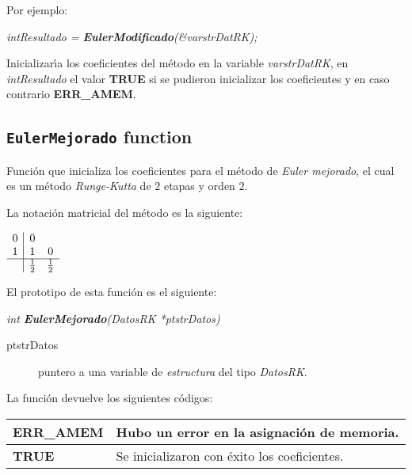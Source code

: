 Por ejemplo:

\begin{center}
\emph{intResultado = \textbf{EulerModificado}(\&varstrDatRK);}
\end{center}


Inicializar\'{\i}a los coeficientes del m\'etodo en la variable
\emph{varstrDatRK}, en \emph{intResultado} el valor \textbf{TRUE} si se pudieron
inicializar los coeficientes y en caso contrario \textbf{ERR\_AMEM}.

\subsection{\texttt{EulerMejorado} function}

Funci\'on que inicializa los coeficientes para el m\'etodo de \emph{Euler mejorado},
el cual es un m\'etodo \emph{Runge-Kutta} de $2$ etapas y orden $2$.\newline

La notaci\'on matricial del m\'etodo es la siguiente:

\begin{center}
$
\begin{array}{c|cc}
0 & 0 \\
1 & 1 & 0 \\
\hline
 & \frac{1}{2} & \frac{1}{2}
\end{array}
$
\end{center}

El prototipo de esta funci\'on es el siguiente:

\begin{center}
\emph{int \textbf{EulerMejorado}(DatosRK *ptstrDatos)}
\end{center}

\begin{description}
\item[ptstrDatos] puntero a una variable de \emph{estructura} del tipo
\emph{DatosRK}.
\end{description}

La funci\'on devuelve los siguientes c\'odigos:

\begin{center}
\begin{tabular}{|l|l|}
\hline
\textbf{ERR\_AMEM} & Hubo un error en la asignaci\'on de memoria. \\
\hline
\textbf{TRUE} & Se inicializaron con \'exito los coeficientes. \\
\hline
\end{tabular}
\end{center}

